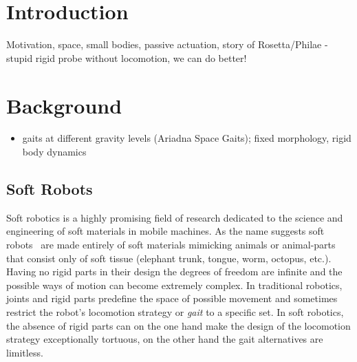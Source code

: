 \documentclass{sig-alternate}
\begin{document}



\section{Introduction}
Motivation, space, small bodies, passive actuation, story of Rosetta/Philae - stupid rigid probe without locomotion, we can do better!

\section{Background}
\begin{itemize}
\item gaits at different gravity levels (Ariadna Space Gaits); fixed morphology, rigid body dynamics
\end{itemize}
\subsection{Soft Robots}

Soft robotics is a highly promising field of research dedicated to the science and engineering of soft materials in mobile machines. As the name suggests soft robots~\cite{trivedi2008soft, pfeifer2012challenges} are made entirely of soft materials mimicking animals or animal-parts that consist only of soft tissue (elephant trunk, tongue, worm, octopus, etc.). Having no rigid parts in their design the degrees of freedom are infinite and the possible ways of motion can become extremely complex. In traditional robotics, joints and rigid parts predefine the space of possible movement and sometimes restrict the robot's locomotion strategy or \emph{gait} to a specific set. In soft robotics, the absence of rigid parts can on the one hand make the design of the locomotion strategy exceptionally tortuous, on the other hand the gait alternatives are limitless.
\end{document}
